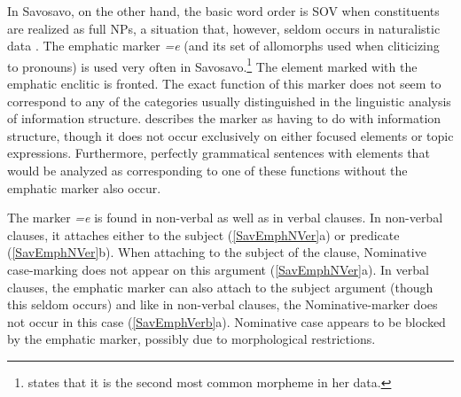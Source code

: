 In Savosavo, on the other hand, the basic word order is SOV when constituents are realized as full NPs, a situation that, however, seldom occurs in naturalistic data \citep[199--200]{Wegener:2008}. 
The emphatic marker \emph{=e} (and its set of allomorphs used when cliticizing to pronouns) is used very often in Savosavo.\footnote{\citet[221]{Wegener:2008} states that it is the second most common morpheme in her data.}
The element marked with the emphatic enclitic is fronted.
The exact function of this marker does not seem to correspond to any of the categories usually distinguished in the linguistic analysis of information structure.
\citet[228--229]{Wegener:2008} describes the marker as having to do with information structure, though it does not occur exclusively on either focused elements or topic expressions. Furthermore, perfectly grammatical sentences with elements that would be analyzed as corresponding to one of these functions without the emphatic marker also occur. 

The marker \emph{=e} is found in non-verbal as well as in verbal clauses. 
In non-verbal clauses, it attaches either to the subject (\ref{SavEmphNVer}a) or predicate (\ref{SavEmphNVer}b). 
When attaching to the subject of the clause, Nominative case-marking does not appear on this argument (\ref{SavEmphNVer}a). 
In verbal clauses, the emphatic marker can also attach to the subject argument (though this seldom occurs) and like in non-verbal clauses, the Nominative-marker does not occur in this case (\ref{SavEmphVerb}a). 
Nominative case appears to be blocked by the emphatic marker, possibly due to morphological restrictions. 

